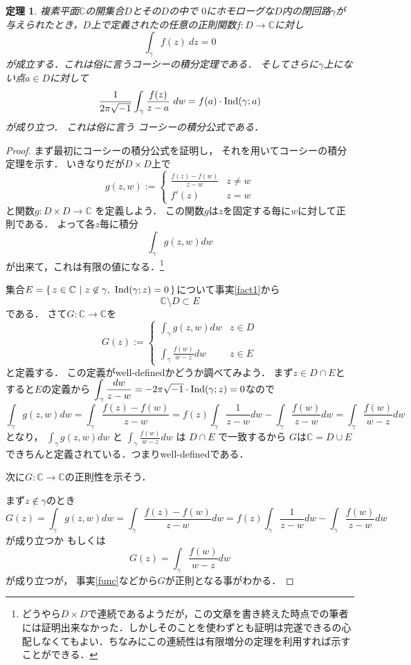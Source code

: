 \documentclass[leqno, 12pt, a4paper]{jsarticle}
\newtheorem{thm}{定理}
\newcommand{\cc}{\mathbb{C}}
\newcommand{\dpst}{\displaystyle}
\newcommand{\ind}{\text{{\rm Ind}}}
\newcommand{\img}{\sqrt{-1}}
\begin{document}
\begin{thm}
複素平面$\cc$の開集合$D$とその$D$の中で
$0$にホモローグな$D$内の閉回路$\gamma$が与えられたとき，$D$上で定義されたの任意の正則関数$f: D\to \cc$に対し
\[
\int_{\gamma}f(z)\ dz=0
\]
が成立する．これは俗に言うコーシーの積分定理である．
そしてさらに$\gamma$上にない点$a\in D$に対して
\[
\frac{1}{2\pi \img}\int_{\gamma}\frac{f(z)}{z-a}\ dw=
f(a)\cdot \ind(\gamma;a)
\]
が成り立つ．
これは俗に言う
コーシーの積分公式である．
\end{thm}
\begin{proof}
まず最初にコーシーの積分公式を証明し，
それを用いてコーシーの積分定理を示す．
いきなりだが$D\times D$上で
\begin{equation*}
g(z,w):=   
   \begin{cases}
     \displaystyle{\frac{f(z)-f(w)}{z-w}} & \text{$z\neq w$}\\


    f'(z) & \text{$z=w$}
   \end{cases}
\end{equation*}
と関数$g:D\times D\to \cc$
を定義しよう．
この関数$g$は$z$を固定する毎に$w$に対して正則である．
よって各$z$毎に積分
\[
{\int_{\gamma}g(z,w) dw}
\]
が出来て，これは有限の値になる．\footnote{どうやら$D\times D$で連続であるようだが，この文章を書き終えた時点での筆者には証明出来なかった．しかしそのことを使わずとも証明は完遂できるの心配しなくてもよい．ちなみにこの連続性は有限増分の定理を利用すれば示すことができる．}
\par

集合$E=\{\, 
z\in \cc \ |\ z\not\in \gamma,\ \ind(\gamma;z)=0 
\, \}$について事実\ref{fact1}から
\[
\cc\setminus D\subset E
\]
である．
さて$G:\cc\to \cc$を
\begin{equation}
G(z):=\begin{cases} 
     \displaystyle{\int_{\gamma}g(z,w) dw} & \text{$z\in D$}\\
\\
     \displaystyle{\int_{\gamma}\frac{f(w)}{w-z}}dw & \text{$z\in E$}
   \end{cases}
\end{equation}
と定義する．
この定義がwell-definedかどうか調べてみよう．
まず$z\in D\cap E$とすると$E$の定義から
$\dpst \int_{\gamma}\frac{dw}{z-w}
=-2\pi \img\cdot \ind(\gamma;z)=0$なので
\[
\int_{\gamma}g(z,w) dw=\int_{\gamma}\frac{f(z)-f(w)}{z-w}=f(z)\int_{\gamma}\frac{1}{z-w}dw-\int_{\gamma}\frac{f(w)}{z-w}dw=\int_{\gamma}\frac{f(w)}{w-z}dw
\]
となり，
$ \displaystyle{\int_{\gamma}g(z,w) dw}$
と
$     \displaystyle{\int_{\gamma}\frac{f(w)}{w-z}}dw$
は
$D\cap E$
で一致するから
$G$は$\cc=D\cup E$できちんと定義されている．つまりwell-definedである．
\par
次に$G: \cc\to \cc$の正則性を示そう．
\par
まず$z\not\in \gamma$のとき
\[
G(z)=\int_{\gamma}g(z,w) dw=\int_{\gamma}\frac{f(z)-f(w)}{z-w}dw=f(z)\int_{\gamma}\frac{1}{z-w}dw-\int_{\gamma}\frac{f(w)}{z-w}dw
\]
が成り立つか
もしくは
\[
G(z)={\int_{\gamma}\frac{f(w)}{w-z}}dw
\]
が成り立つが，
事実\ref{func}などから$G$が正則となる事がわかる．
\par


\end{proof}
\end{document}
